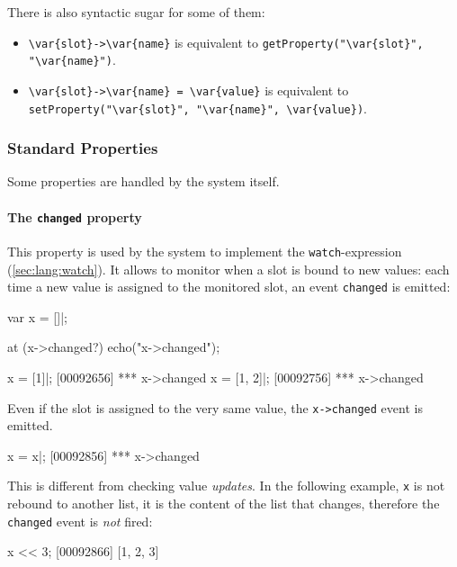 There is also syntactic sugar for some of them:

\begin{itemize}
\item \lstinline|\var{slot}->\var{name}| is equivalent to
  \lstinline[style=varInString]|getProperty("\var{slot}", "\var{name}")|.
\item \lstinline|\var{slot}->\var{name} = \var{value}| is equivalent to
  \lstinline[style=varInString]|setProperty("\var{slot}", "\var{name}", \var{value})|.
\end{itemize}

\subsubsection{Standard Properties}
\label{sec:lang:prop:std}

Some properties are handled by the system itself.


\paragraph{The \lstinline{changed} property}

This property is used by the system to implement the
\lstinline{watch}-expression (\autoref{sec:lang:watch}).  It allows to
monitor when a slot is bound to new values: each time a new value is
assigned to the monitored slot, an event \lstinline{changed} is emitted:

\begin{urbiscript}[firstnumber=1]
var x = []|;

at (x->changed?)
  echo("x->changed");

x = [1]|;
[00092656] *** x->changed
x = [1, 2]|;
[00092756] *** x->changed
\end{urbiscript}

Even if the slot is assigned to the very same value, the
\lstinline|x->changed| event is emitted.

\begin{urbiscript}
x = x|;
[00092856] *** x->changed
\end{urbiscript}

This is different from checking value \emph{updates}.  In the following
example, \lstinline{x} is not rebound to another list, it is the content of
the list that changes, therefore the \lstinline{changed} event is \emph{not}
fired:

\begin{urbiscript}
x << 3;
[00092866] [1, 2, 3]
\end{urbiscript}

